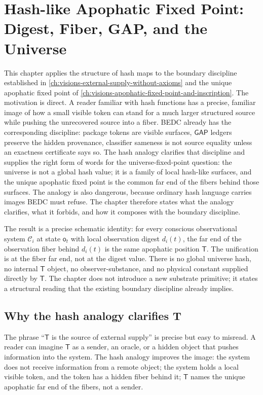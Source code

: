 \chapter{Hash-like Apophatic Fixed Point: Digest, Fiber, GAP, and the Universe}
\label{ch:visions-hash-like-apophatic-fixed-point}

This chapter applies the structure of hash maps to the boundary discipline established in \autoref{ch:visions-external-supply-without-axioms} and the unique apophatic fixed point of \autoref{ch:visions-apophatic-fixed-point-and-inscription}. The motivation is direct. A reader familiar with hash functions has a precise, familiar image of how a small visible token can stand for a much larger structured source while pushing the unrecovered source into a fiber. BEDC already has the corresponding discipline: package tokens are visible surfaces, $\mathsf{GAP}$ ledgers preserve the hidden provenance, classifier sameness is not source equality unless an exactness certificate says so. The hash analogy clarifies that discipline and supplies the right form of words for the universe-fixed-point question: the universe is not a global hash value; it is a family of local hash-like surfaces, and the unique apophatic fixed point is the common far end of the fibers behind those surfaces. The analogy is also dangerous, because ordinary hash language carries images BEDC must refuse. The chapter therefore states what the analogy clarifies, what it forbids, and how it composes with the boundary discipline.

The result is a precise schematic identity: for every conscious observational system $\mathcal{C}_i$ at state $\mathsf{o}_t$ with local observation digest $d_i(t)$, the far end of the observation fiber behind $d_i(t)$ is the same apophatic position $\mathsf{T}$. The unification is at the fiber far end, not at the digest value. There is no global universe hash, no internal $\mathsf{T}$ object, no observer-substance, and no physical constant supplied directly by $\mathsf{T}$. The chapter does not introduce a new substrate primitive; it states a structural reading that the existing boundary discipline already implies.

\section{Why the hash analogy clarifies T}
\label{sec:hash-like-why-analogy-clarifies}

The phrase ``$\mathsf{T}$ is the source of external supply'' is precise but easy to misread. A reader can imagine $\mathsf{T}$ as a sender, an oracle, or a hidden object that pushes information into the system. The hash analogy improves the image: the system does not receive information from a remote object; the system holds a local visible token, and the token has a hidden fiber behind it; $\mathsf{T}$ names the unique apophatic far end of the fibers, not a sender.

